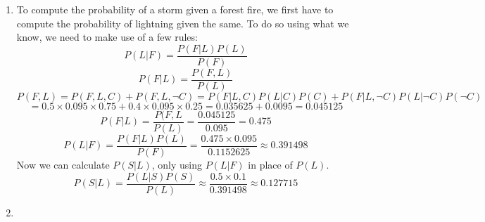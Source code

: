 \documentclass{article}
\begin{document}
\begin{enumerate}
\begin{enumerate}
        \item
            To compute the probability of a storm given a forest fire, we first have to compute the probability of lightning given the same.
            To do so using what we know, we need to make use of a few rules:
            $$P(L|F) = \frac{P(F|L)P(L)}{P(F)}$$
            $$P(F|L) = \frac{P(F,L)}{P(L)}$$
            $$P(F,L) = P(F,L,C) + P(F,L,\neg C) = P(F|L,C)P(L|C)P(C) + P(F|L,\neg C)P(L|\neg C)P(\neg C)$$
            $$ = 0.5\times0.095\times0.75 + 0.4\times0.095\times0.25 = 0.035625 + 0.0095 = 0.045125$$
            $$P(F|L) = \frac{P(F,L}{P(L)} = \frac{0.045125}{0.095} = 0.475$$
            $$P(L|F) = \frac{P(F|L)P(L)}{P(F)} = \frac{0.475\times0.095}{0.1152625} \approx 0.391498 $$
            Now we can calculate $P(S|L)$, only using $P(L|F)$ in place of $P(L)$.
            $$P(S|L) = \frac{P(L|S)P(S)}{P(L)} \approx \frac{0.5\times0.1}{0.391498} \approx 0.127715 $$

        \item

    \end{enumerate}
\end{enumerate}
\end{document}
